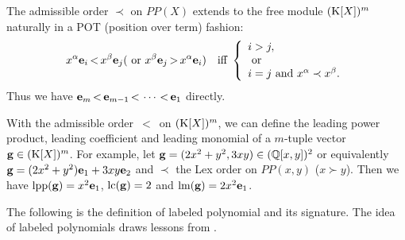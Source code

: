 \documentclass[preprint,authoryear,3p,12pt]{elsarticle}
\newtheorem{define}[theorem]{Definition}
\def\K{{\rm K}}
\def\lm{{\rm lm}}
\def\lpp{{\rm lpp}}
\def\lc{{\rm lc}}
\def\eb{{\bf e}}
\def\gb{{\bf g}}
\def\sp{{\rm spoly}}
\def\Q{{\mathbb{Q}}}
\def\prs{{\,<\,}}
\def\sus{{\,>\,}}
\begin{document}
The admissible order $\prec$ on $PP(X)$ extends to the free module
$(\K[X])^m$ naturally in a POT (position over term) fashion:
$$x^\alpha\eb_i \prs x^\beta\eb_j (\mbox{ or } x^\beta\eb_j \sus x^\alpha\eb_i)\ \ \mbox{  iff  }
\left\{\begin{array}{l} i > j, \\ \mbox{ or } \\ i = j \mbox{ and
} x^\alpha \prec x^\beta.
\end{array}\right.
$$ Thus we have $\eb_m \prs \eb_{m-1} \prs \cdots \prs
\eb_1$ directly.

With the admissible order $\prs$ on $(\K[X])^m$, we can define the leading power product, leading coefficient and leading
monomial of a $m$-tuple vector $\gb\in (\K[X])^m$. For example, let $\gb=(2x^2+y^2, 3xy)\in (\Q[x, y])^2$ or equivalently
$\gb=(2x^2+y^2)\eb_1+3xy\eb_2$ and $\prec$ the Lex order on $PP(x, y)$ ($x \succ y$). Then we have $\lpp(\gb)=x^2\eb_1$,
$\lc(\gb)=2$ and $\lm(\gb)=2x^2\eb_1$.




The following is the definition of labeled polynomial and its signature. The idea of labeled polynomials draws lessons from
\citep{Gao09}.
\end{document}
